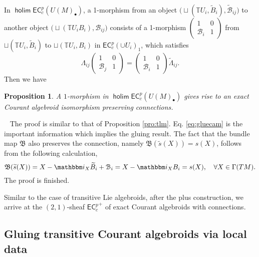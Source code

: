 \documentclass[letterpaper,10pt, oneside]{article} %
\newtheorem{pro}[thm]{Proposition}
\newcommand{\ecalgdp}{\mathsf{EC}^{p}_{c}} %
\DeclareMathOperator{\holim}{\mathsf{holim}}
\newcommand{\tangui}{{\mathbb{T} U_i}}
\newcommand{\pf}{\noindent{\bf Proof.}\ }
\newcommand{\ii}{\mathbbm i}
\newcommand{\huaB}{\mathcal{B}}%
\newcommand{\frkB}{\mathfrak B}
\def\qed{\hfill ~\vrule height6pt width6pt depth0pt}
\begin{document}
In $\holim \ecalgdp(U(M)_\bullet)$, a  1-morphism from  an object $\Big(\sqcup (\tangui,
   \widetilde{B}_i),\widetilde{\huaB}_{ij}\Big) $  to another object $\Big(\sqcup (\tangui
   B_i),\huaB_{ij}\Big) $ consists of
  a 1-morphism $\left(\begin{array}{cc}
1&0\\
\huaB_{i}&1
\end{array} \right)$ from $ \sqcup (\tangui,
   \widetilde{B}_i)$ to $ \sqcup (\tangui,
    B_i)$  in $\ecalgdp(\cup U_i)_1$, which satisfies
  \begin{equation}\label{eq:gluecam}
    \Lambda_{ij}\left(\begin{array}{cc}
1&0\\
\huaB_{j}&1
\end{array} \right)=\left(\begin{array}{cc}
1&0\\
\huaB_{i}&1
\end{array} \right)\widetilde{\Lambda}_{ij}.
  \end{equation}
 Then we have

  \begin{pro} \label{pro:ecm}
 A  $1$-morphism in $\holim \ecalgdp(U(M)_\bullet)$ gives rise to an exact Courant algebroid isomorphism preserving connections.
  \end{pro}
\pf
The proof is similar to that of Proposition \ref{pro:tlm}. Eq. \eqref{eq:gluecam} is the important information which implies the gluing result. The fact that the bundle map $\frkB$ also preserves the connection, namely $\frkB(\widetilde{s}(X))=s(X)$, follows from the following calculation,
$$
\frkB(\widetilde{s}(X))=X-\ii_X\widetilde{B}_i+\huaB_i=X-\ii_XB_i=s(X),\quad \forall X\in \Gamma(TM).
$$
The proof is finished. \qed\vspace{3mm}



Similar to the case of transitive Lie algebroids, after the plus construction, we arrive at the $(2,1)$-sheaf ${\ecalgdp}^+$ of exact Courant algebroids with connections.





\subsection{Gluing transitive Courant algebroids via local data}\label{GluingCA}
\end{document}
